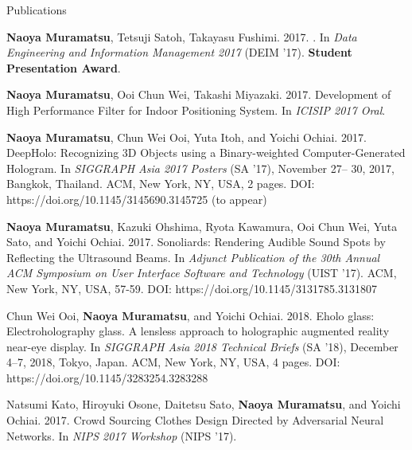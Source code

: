 \documentclass{resume} %
\begin{document}

\begin{rSection}{Publications} \itemsep 4pt

\item \textbf{Naoya Muramatsu}, Tetsuji Satoh, Takayasu Fushimi. 2017. . In \textit{Data Engineering and Information Management 2017} (DEIM '17). \textbf{Student Presentation Award}.  %
\item \textbf{Naoya Muramatsu}, Ooi Chun Wei, Takashi Miyazaki. 2017. Development of High Performance Filter for Indoor Positioning System. In \textit{ICISIP 2017 Oral}.
\item \textbf{Naoya Muramatsu}, Chun Wei Ooi, Yuta Itoh, and Yoichi Ochiai. 2017. DeepHolo: Recognizing 3D Objects using a Binary-weighted Computer-Generated Hologram. In \textit{SIGGRAPH Asia 2017 Posters} (SA '17), November 27– 30, 2017, Bangkok, Thailand. ACM, New York, NY, USA, 2 pages. DOI: https://doi.org/10.1145/3145690.3145725 (to appear)
\item \textbf{Naoya Muramatsu}, Kazuki Ohshima, Ryota Kawamura, Ooi Chun Wei, Yuta Sato, and Yoichi Ochiai. 2017. Sonoliards: Rendering Audible Sound Spots by Reflecting the Ultrasound Beams. In \textit{Adjunct Publication of the 30th Annual ACM Symposium on User Interface Software and Technology} (UIST ’17). ACM, New York, NY, USA, 57-59. DOI: https://doi.org/10.1145/3131785.3131807
\item Chun Wei Ooi, \textbf{Naoya Muramatsu}, and Yoichi Ochiai. 2018. Eholo glass: Electroholography glass. A lensless approach to holographic augmented reality near-eye display. In \textit{SIGGRAPH Asia 2018 Technical Briefs} (SA ’18), December 4–7, 2018, Tokyo, Japan. ACM, New York, NY, USA, 4 pages. DOI: https://doi.org/10.1145/3283254.3283288
\item Natsumi Kato, Hiroyuki Osone, Daitetsu Sato, \textbf{Naoya Muramatsu}, and Yoichi Ochiai. 2017. Crowd Sourcing Clothes Design Directed by Adversarial Neural Networks. In \textit{NIPS 2017 Workshop} (NIPS ’17).

\end{rSection}
\end{document}
